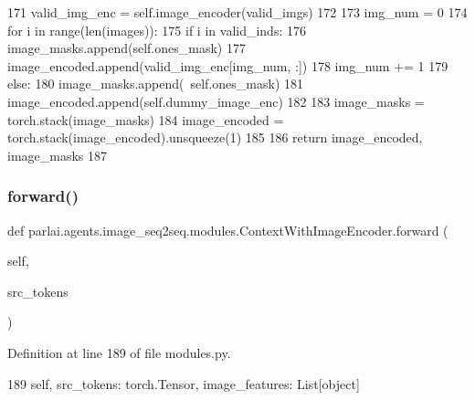 \begin{DoxyCode}
171             valid\_img\_enc = self.image\_encoder(valid\_imgs)
172 
173             img\_num = 0
174             \textcolor{keywordflow}{for} i \textcolor{keywordflow}{in} range(len(images)):
175                 \textcolor{keywordflow}{if} i \textcolor{keywordflow}{in} valid\_inds:
176                     image\_masks.append(self.ones\_mask)
177                     image\_encoded.append(valid\_img\_enc[img\_num, :])
178                     img\_num += 1
179                 \textcolor{keywordflow}{else}:
180                     image\_masks.append(~self.ones\_mask)
181                     image\_encoded.append(self.dummy\_image\_enc)
182 
183             image\_masks = torch.stack(image\_masks)
184             image\_encoded = torch.stack(image\_encoded).unsqueeze(1)
185 
186         \textcolor{keywordflow}{return} image\_encoded, image\_masks
187 
\end{DoxyCode}
\mbox{\label{classparlai_1_1agents_1_1image__seq2seq_1_1modules_1_1ContextWithImageEncoder_a8fc65267bbc64c1f857c32d6ba9f260d}} 
\subsubsection{\texorpdfstring{forward()}{forward()}}
{\footnotesize\ttfamily def parlai.\+agents.\+image\+\_\+seq2seq.\+modules.\+Context\+With\+Image\+Encoder.\+forward (\begin{DoxyParamCaption}\item[{}]{self,  }\item[{}]{src\+\_\+tokens }\end{DoxyParamCaption})}



Definition at line 189 of file modules.\+py.


\begin{DoxyCode}
189         self, src\_tokens: torch.Tensor, image\_features: List[object]
\end{DoxyCode}


